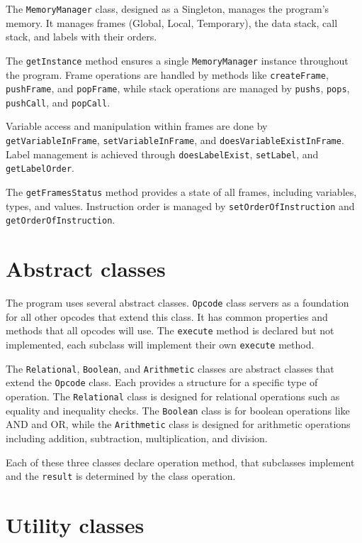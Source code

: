 \documentclass[10pt,a4paper]{article}
\begin{document}
The \texttt{MemoryManager} class, designed as a Singleton, manages the program's memory. It manages frames (Global, Local, Temporary), the data stack, call stack, and labels with their orders.

The \texttt{getInstance} method ensures a single \texttt{MemoryManager} instance throughout the program. Frame operations are handled by methods like \texttt{createFrame}, \texttt{pushFrame}, and \texttt{popFrame}, while stack operations are managed by \texttt{pushs}, \texttt{pops}, \texttt{pushCall}, and \texttt{popCall}.

Variable access and manipulation within frames are done by \texttt{getVariableInFrame}, \texttt{setVariableInFrame}, and \texttt{doesVariableExistInFrame}. Label management is achieved through \texttt{doesLabelExist}, \texttt{setLabel}, and \texttt{getLabelOrder}.

The \texttt{getFramesStatus} method provides a state of all frames, including variables, types, and values. Instruction order is managed by \texttt{setOrderOfInstruction} and \texttt{getOrderOfInstruction}.

\section*{Abstract classes} The program uses several abstract classes. \texttt{Opcode} class servers as a foundation for all other opcodes that extend this class. It has common properties and methods that all opcodes will use. The \texttt{execute} method is declared but not implemented, each subclass will implement their own \texttt{execute} method.

The \texttt{Relational}, \texttt{Boolean}, and \texttt{Arithmetic} classes are abstract classes that extend the \texttt{Opcode} class. Each provides a structure for a specific type of operation. The \texttt{Relational} class is designed for relational operations such as equality and inequality checks. The \texttt{Boolean} class is for boolean operations like AND and OR, while the \texttt{Arithmetic} class is designed for arithmetic operations including addition, subtraction, multiplication, and division.

Each of these three classes declare operation method, that subclasses implement and the \texttt{result} is determined by the class operation.

\section*{Utility classes}
\end{document}
